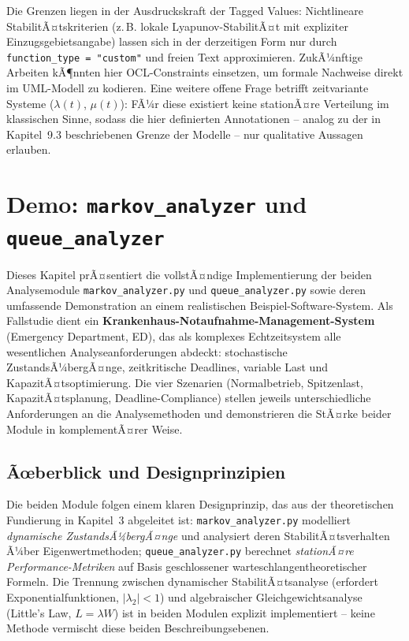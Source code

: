 ﻿\documentclass[a4paper,12pt]{report}
\theoremstyle{definition}
\begin{document}
Die Grenzen liegen in der Ausdruckskraft der Tagged Values: Nichtlineare
StabilitÃ¤tskriterien (z.\,B. lokale Lyapunov-StabilitÃ¤t mit expliziter
Einzugsgebietsangabe) lassen sich in der derzeitigen Form nur durch
\texttt{function\_type = "custom"} und freien Text approximieren. ZukÃ¼nftige
Arbeiten kÃ¶nnten hier OCL-Constraints einsetzen, um formale Nachweise direkt
im UML-Modell zu kodieren. Eine weitere offene Frage betrifft
zeitvariante Systeme ($\lambda(t)$, $\mu(t)$): FÃ¼r diese existiert keine
stationÃ¤re Verteilung im klassischen Sinne, sodass die hier definierten
Annotationen -- analog zu der in Kapitel~9.3 beschriebenen Grenze der
Modelle -- nur qualitative Aussagen erlauben.

\section{Demo: \texttt{markov\_analyzer} und \texttt{queue\_analyzer}}
\label{sec:demo}

Dieses Kapitel prÃ¤sentiert die vollstÃ¤ndige Implementierung der beiden
Analysemodule \texttt{markov\_analyzer.py} und \texttt{queue\_analyzer.py}
sowie deren umfassende Demonstration an einem realistischen Beispiel-Software-System.
Als Fallstudie dient ein \textbf{Krankenhaus-Notaufnahme-Management-System}
(Emergency Department, ED), das als komplexes Echtzeitsystem alle wesentlichen
Analyseanforderungen abdeckt: stochastische ZustandsÃ¼bergÃ¤nge, zeitkritische
Deadlines, variable Last und KapazitÃ¤tsoptimierung. Die vier Szenarien
(Normalbetrieb, Spitzenlast, KapazitÃ¤tsplanung, Deadline-Compliance) stellen
jeweils unterschiedliche Anforderungen an die Analysemethoden und demonstrieren
die StÃ¤rke beider Module in komplementÃ¤rer Weise.

\subsection{Ãœberblick und Designprinzipien}

Die beiden Module folgen einem klaren Designprinzip, das aus der
theoretischen Fundierung in Kapitel~3 abgeleitet ist:
\texttt{markov\_analyzer.py} modelliert \emph{dynamische ZustandsÃ¼bergÃ¤nge}
und analysiert deren StabilitÃ¤tsverhalten Ã¼ber Eigenwertmethoden;
\texttt{queue\_analy\newline zer.py} berechnet \emph{stationÃ¤re Performance-Metriken}
auf Basis geschlossener warteschlangentheoretischer Formeln.
Die Trennung zwischen dynamischer StabilitÃ¤tsanalyse
(erfordert Exponentialfunktionen, $|\lambda_2| < 1$) und algebraischer
Gleichgewichtsanalyse (Little's Law, $L = \lambda W$) ist in beiden Modulen
explizit implementiert -- keine Methode vermischt diese beiden Beschreibungsebenen.
\end{document}
